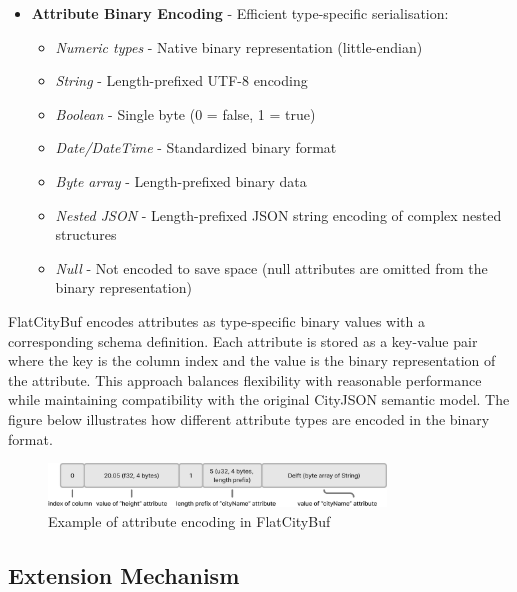 \begin{itemize}
  \item \textbf{Attribute Binary Encoding} - Efficient type-specific serialisation:
    \begin{itemize}
      \item \textit{Numeric types} - Native binary representation (little-endian)
      \item \textit{String} - Length-prefixed UTF-8 encoding
      \item \textit{Boolean} - Single byte (0 = false, 1 = true)
      \item \textit{Date/DateTime} - Standardized binary format
      \item \textit{Byte array} - Length-prefixed binary data
      \item \textit{Nested JSON} - Length-prefixed JSON string encoding of complex nested structures
      \item \textit{Null} - Not encoded to save space (null attributes are omitted from the binary representation)
    \end{itemize}
\end{itemize}

FlatCityBuf encodes attributes as type-specific binary values with a corresponding schema definition. Each attribute is stored as a key-value pair where the key is the column index and the value is the binary representation of the attribute. This approach balances flexibility with reasonable performance while maintaining compatibility with the original CityJSON semantic model. The figure below illustrates how different attribute types are encoded in the binary format.

\begin{figure}[htbp]
  \centering
  \includegraphics[width=0.8\textwidth]{figs/methodology/attribute_structure.png}
  \caption{Example of attribute encoding in FlatCityBuf}
  \label{methodology:feature_encoding:attribute_encoding:figure}
\end{figure}

\subsection{Extension Mechanism}
\label{methodology:feature_encoding:extension_mechanism}

